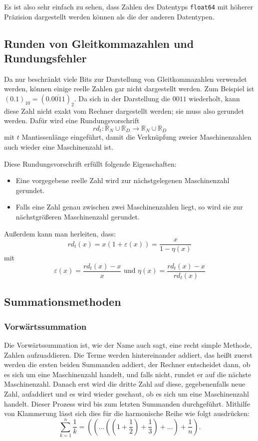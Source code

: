 \documentclass{scrartcl}
\begin{document}
Es ist also sehr einfach zu sehen, dass Zahlen des Datentyps \texttt{float64} mit
höherer Präzision dargestellt werden können als die der anderen Datentypen.

\subsection{Runden von Gleitkommazahlen und Rundungsfehler}
Da nur beschränkt viele Bits zur Darstellung von Gleitkommazahlen verwendet
werden, können einige reelle Zahlen gar nicht dargestellt werden.
Zum Beispiel ist \( (0.1)_{10} = (0.
\overline{0011})_2 \).
Da sich in der Darstellung die \(0011\) wiederholt, kann diese Zahl nicht exakt
vom Rechner dargestellt werden; sie muss also gerundet werden.
Dafür wird eine Rundungsvorschrift
\begin{equation*}
    rd_t: \mathbb{R}_N \cup \mathbb{R}_D \rightarrow \mathbb{R}_N \cup \mathbb{R}_D
\end{equation*}
mit \(t\) Mantissenlänge eingeführt, damit die Verknüpfung zweier Maschinenzahlen auch wieder eine
Maschinenzahl ist.

Diese Rundungsvorschrift erfüllt folgende Eigenschaften:
\begin{itemize}
    \item Eine vorgegebene reelle Zahl wird zur nächstgelegenen Maschinenzahl gerundet.
    \item Falls eine Zahl genau zwischen zwei Maschinenzahlen liegt, so wird sie zur nächstgrößeren Maschinenzahl gerundet.
\end{itemize}

Außerdem kann man herleiten, dass: \[ rd_t(x) = x(1+\varepsilon(x)) =
    \frac{x}{1-\eta(x)} \] mit \[ \varepsilon(x) = \frac{rd_t(x) - x}{x} \text{ und
    } \eta(x) = \frac{rd_t(x) - x}{rd_t(x)} \]

\subsection{Summationsmethoden} \subsubsection{Vorwärtssummation} Die
Vorwärtssummation ist, wie der Name auch sagt, eine recht simple Methode,
Zahlen aufzuaddieren.
Die Terme werden hintereinander addiert, das heißt zuerst werden die ersten
beiden Summanden addiert, der Rechner entscheidet dann, ob es sich um eine
Maschinenzahl handelt, und falls nicht, rundet er auf die nächste
Maschinenzahl.
Danach erst wird die dritte Zahl auf diese, gegebenenfalls neue Zahl,
aufaddiert und es wird wieder geschaut, ob es sich um eine Maschinenzahl
handelt.
Dieser Prozess wird bis zum letzten Summanden durchgeführt.
Mithilfe von Klammerung lässt sich dies für die harmonische Reihe wie folgt
ausdrücken:
\begin{equation*}
    \sum_{k=1}^{n} \frac{1}{k} = ((\ldots((1 + \frac{1}{2}) + \frac{1}{3}) + \ldots) + \frac{1}{n}).
\end{equation*}
\end{document}
